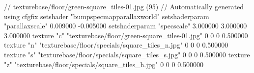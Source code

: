 // texturebase/floor/green-square_tiles-01.jpg (95)
// Automatically generated using cfgfix
setshader "bumpspecmapparallaxworld"
setshaderparam "parallaxscale" 0.009000 -0.005000
setshaderparam "specscale" 3.000000 3.000000 3.000000
texture "c" "texturebase/floor/green-square_tiles-01.jpg" 0 0 0 0.500000
texture "n" "texturebase/floor/specials/square_tiles_n.jpg" 0 0 0 0.500000
texture "s" "texturebase/floor/specials/square_tiles_s.jpg" 0 0 0 0.500000
texture "z" "texturebase/floor/specials/square_tiles_h.jpg" 0 0 0 0.500000
